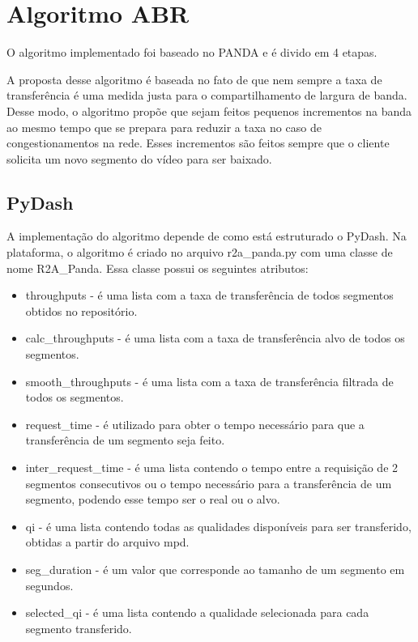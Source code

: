 \documentclass[10pt,twocolumn,letterpaper]{article}
\begin{document}
\section{Algoritmo ABR}
O algoritmo implementado foi baseado no PANDA\cite{panda} e é divido em 4 etapas.

A proposta desse algoritmo é baseada no fato de que nem sempre a taxa de transferência é uma medida justa para o compartilhamento de largura de banda. Desse modo, o algoritmo propõe que sejam feitos pequenos incrementos na banda ao mesmo tempo que se prepara para reduzir a taxa no caso de congestionamentos na rede. Esses incrementos são feitos sempre que o cliente solicita um novo segmento do vídeo para ser baixado.

\subsection{PyDash}
A implementação do algoritmo depende de como está estruturado o PyDash. Na plataforma, o algoritmo é criado no arquivo r2a\_panda.py com uma classe de nome R2A\_Panda. Essa classe possui os seguintes atributos:

\begin{itemize}
	\item throughputs - é uma lista com a taxa de transferência de todos segmentos obtidos no repositório.
	\item calc\_throughputs - é uma lista com a taxa de transferência alvo de todos os segmentos.
	\item smooth\_throughputs - é uma lista com a taxa de transferência filtrada de todos os segmentos.
	\item request\_time - é utilizado para obter o tempo necessário para que a transferência de um segmento seja feito.
	\item inter\_request\_time - é uma lista contendo o tempo entre a requisição de 2 segmentos consecutivos ou o tempo necessário para a transferência de um segmento, podendo esse tempo ser o real ou o alvo.
	\item qi - é uma lista contendo todas as qualidades disponíveis para ser transferido, obtidas a partir do arquivo mpd.
	\item seg\_duration - é um valor que corresponde ao tamanho de um segmento em segundos.
	\item selected\_qi - é uma lista contendo a qualidade selecionada para cada segmento transferido.
\end{itemize}
\end{document}
